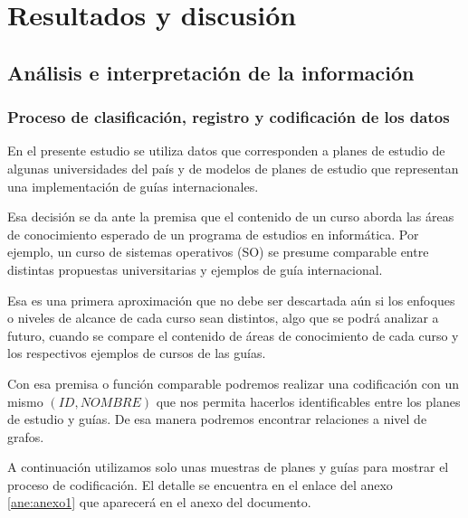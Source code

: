 \chapter{Resultados y discusión}

\section{Análisis e interpretación de la información}


\subsection{Proceso de clasificación, registro y codificación de los datos}


En el presente estudio se utiliza datos que corresponden a  planes de estudio de algunas universidades del país y de modelos de planes de estudio que representan una implementación de guías internacionales. 

Esa decisión se da ante la premisa que el contenido de un curso aborda las áreas de conocimiento esperado de un programa de estudios en informática. Por ejemplo, un curso de sistemas operativos (SO) se presume comparable entre distintas propuestas universitarias y ejemplos de guía internacional. 

Esa es una primera aproximación que no debe ser descartada aún si los enfoques o niveles de alcance de cada curso sean distintos, algo que se podrá analizar a futuro,  cuando se compare el contenido de áreas de conocimiento de cada curso y los respectivos ejemplos de cursos de las guías. 

Con esa premisa o función comparable podremos realizar una codificación con un mismo $(ID,NOMBRE)$ que nos permita hacerlos identificables entre los planes de estudio y guías. De esa manera podremos encontrar relaciones a nivel de grafos.

A continuación utilizamos solo unas muestras de planes y guías para mostrar el proceso de codificación. El detalle se encuentra en el enlace del anexo \ref{ane:anexo1} que aparecerá en el anexo del documento.

